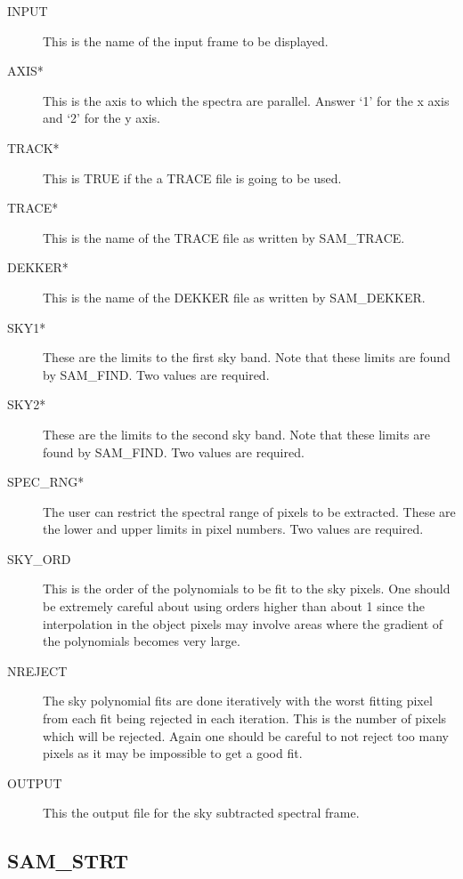 \begin{description}

\item[INPUT] This is the name of the input frame to be displayed.

\item[AXIS*] This is the axis to which the spectra are parallel.  Answer `1'
for the x axis and `2' for the y axis.

\item[TRACK*] This is TRUE if the a TRACE file is going to be used.

\item[TRACE*] This is the name of the TRACE file as written by SAM\_TRACE.

\item[DEKKER*] This is the name of the DEKKER file as written by SAM\_DEKKER.

\item[SKY1*] These are the limits to the first sky band.  Note that these
limits are found by SAM\_FIND.  Two values are required.

\item[SKY2*] These are the limits to the second sky band.  Note that these
limits are found by SAM\_FIND.  Two values are required.

\item[SPEC\_RNG*] The user can restrict the spectral range of pixels to be
extracted. These are the lower and upper limits in pixel numbers.  Two values
are required.

\item[SKY\_ORD] This is the order of the polynomials to be fit to the sky
pixels.  One should be extremely careful about using orders higher than about
1 since the interpolation in the object pixels may involve areas where the
gradient of the polynomials becomes very large.

\item[NREJECT]  The sky polynomial fits are done iteratively with the worst
fitting pixel from each fit being rejected in each iteration.  This is the
number of pixels which will be rejected.  Again one should be careful to not
reject too many pixels as it may be impossible to get a good fit.

\item[OUTPUT] This the output file for the sky subtracted spectral frame.

\end{description}

\subsection{SAM\_STRT}

